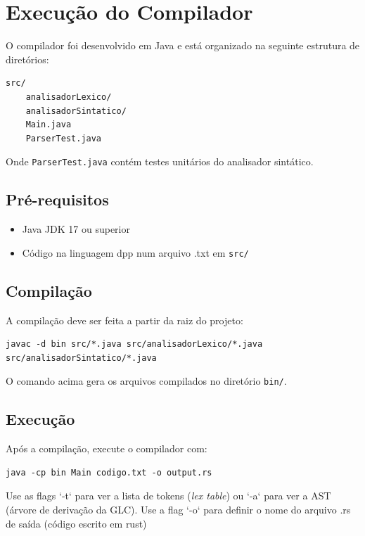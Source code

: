 \documentclass[a4paper,12pt]{article}
\begin{document}
\section{Execução do Compilador}

O compilador foi desenvolvido em Java e está organizado na seguinte estrutura de diretórios:

\begin{lstlisting}
src/
    analisadorLexico/
    analisadorSintatico/
    Main.java
    ParserTest.java
\end{lstlisting}

Onde \texttt{ParserTest.java} contém testes unitários do analisador sintático. 

\subsection{Pré-requisitos}
\begin{itemize}
    \item Java JDK 17 ou superior
    \item Código na linguagem dpp num arquivo .txt em \texttt{src/}
\end{itemize}

\subsection{Compilação}

A compilação deve ser feita a partir da raiz do projeto:

\begin{lstlisting}
javac -d bin src/*.java src/analisadorLexico/*.java src/analisadorSintatico/*.java
\end{lstlisting}

O comando acima gera os arquivos compilados no diretório \texttt{bin/}.

\subsection{Execução}

Após a compilação, execute o compilador com:

\begin{lstlisting}
java -cp bin Main codigo.txt -o output.rs
\end{lstlisting}

Use as flags `-t` para ver a lista de tokens (\emph{lex table}) ou `-a` para ver a AST (árvore de derivação da GLC).  
Use a flag `-o` para definir o nome do arquivo .rs de saída (código escrito  em rust)
\end{document}
